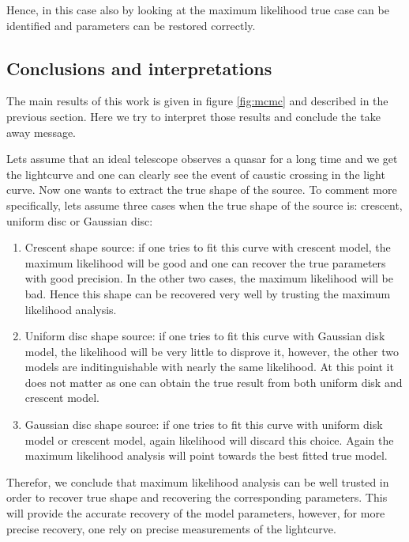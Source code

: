 Hence, in this case also by looking at the maximum likelihood true case can be identified and parameters can be restored correctly.



\subsection{Conclusions and interpretations}
The main results of this work is given in figure \ref{fig:mcmc} and described in the previous section. Here we try to interpret those results and conclude the take away message.

Lets assume that an ideal telescope observes a quasar for a long time and we get the lightcurve  and one can clearly see the event of caustic crossing in the light curve. Now one wants to extract the true shape of the source. To comment more specifically, lets assume three cases when the true shape of the source is: crescent, uniform disc or Gaussian disc:

\begin{enumerate}

\item Crescent shape source: if one tries to fit this curve with crescent model, the maximum likelihood will be good and one can recover the true parameters with good precision. In the other two cases, the maximum likelihood will be bad. Hence this shape can be recovered very well by trusting the maximum likelihood analysis.
\item Uniform disc shape source: if one tries to fit this curve with Gaussian disk model, the likelihood will be very little to disprove it, however, the other two models are inditinguishable with nearly the same likelihood. At this point it does not matter as one can obtain the true result from both uniform disk and crescent model.
\item Gaussian disc shape source: if one tries to fit this curve with uniform disk model or crescent model, again likelihood will discard this choice. Again the maximum likelihood analysis will point towards the best fitted true model.
\end{enumerate}

Therefor, we conclude that maximum likelihood analysis can be well trusted in order to recover true shape and recovering the corresponding parameters. This will provide the accurate recovery of the model parameters, however, for more precise recovery, one rely on precise measurements of the lightcurve. 

 
